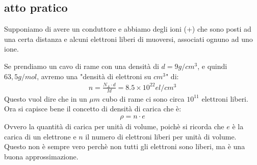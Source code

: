 \documentclass[a4paper, oneside]{article}
\begin{document}
\subsection{atto pratico}
Supponiamo di avere un conduttore e abbiamo degli ioni (+) che sono posti ad una certa distanza e alcuni elettroni liberi di muoversi, associati ognuno ad uno ione.
\begin{center}
\end{center}
Se prendiamo un cavo di rame con una densità di $d=9 g/cm^3$, e quindi $63,5 g/mol$, avremo una "densità di elettroni su $cm^3$" di:
\begin{gather*}
    n = \frac{N_A \cdot d}{M} = 8.5 \times 10^{22} el/cm^3
\end{gather*}
Questo vuol dire che in un $\mu m$ cubo di rame ci sono circa $10^{11}$ elettroni liberi.\\
Ora si capisce bene il concetto di densità di carica che è:
\begin{gather*}
    \rho = n \cdot e
\end{gather*}
Ovvero la quantità di carica per unità di volume, poichè si ricorda che $e$ è la carica di un elettrone e $n$ il numero di elettroni liberi per unità di volume.\\
Questo non è sempre vero perchè non tutti gli elettroni sono liberi, ma è una buona approssimazione.\\
\end{document}

